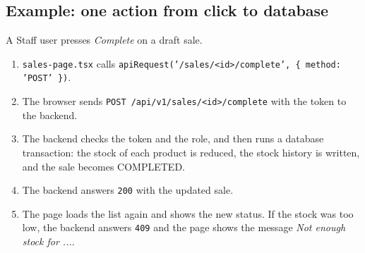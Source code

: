 \documentclass[11pt,a4paper]{article}
\newcommand{\code}[1]{\texttt{#1}}
\begin{document}
\subsection{Example: one action from click to database}
A Staff user presses \emph{Complete} on a draft sale.
\begin{enumerate}
  \item \code{sales-page.tsx} calls \code{apiRequest('/sales/<id>/complete', \{ method: 'POST' \})}.
  \item The browser sends \code{POST /api/v1/sales/<id>/complete} with the token to the backend.
  \item The backend checks the token and the role, and then runs a database transaction: the stock of each product is reduced, the stock history is written, and the sale becomes COMPLETED.
  \item The backend answers \code{200} with the updated sale.
  \item The page loads the list again and shows the new status. If the stock was too low, the backend answers \code{409} and the page shows the message \emph{Not enough stock for ...}.
\end{enumerate}
\end{document}
